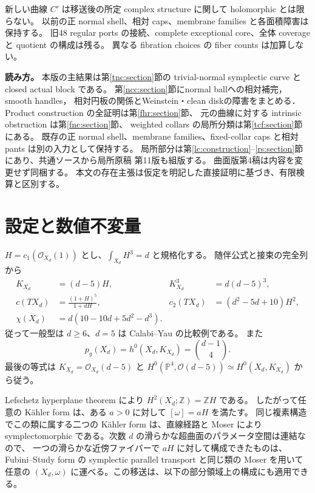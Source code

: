 \documentclass[11pt,a4paper]{article}
\theoremstyle{definition}
\newcommand{\PP}{\mathbb P}
\newcommand{\ZZ}{\mathbb Z}
\begin{document}
新しい曲線 $C'$ は移送後の所定 complex structure に関して holomorphic とは限らない。
以前の正 normal shell、相対 caps、membrane families と各面積障害は保持する。
旧48 regular ports の接続、complete exceptional core、全体 coverage と quotient の構成は残る。
異なる fibration choices の fiber counts は加算しない。

\clearpage
\begingroup
\small
\setlength{\parskip}{0pt}
\makeatletter
\renewcommand*{\@pnumwidth}{2.2em}
\renewcommand*{\@tocrmarg}{3.2em}
\renewcommand*{\l@section}[2]{\@dottedtocline{1}{0em}{3.4em}{\bfseries #1}{\bfseries #2}}
\makeatother
\tableofcontents
\endgroup
\medskip
\noindent\textbf{読み方。}
本版の主結果は第\ref{tnc:section}節の trivial-normal symplectic curve と closed actual block である。
第\ref{ncc:section}節にnormal ballへの相対補完，smooth handles，
相対円板の関係とWeinstein・clean diskの障害をまとめる．
Product construction の全証明は第\ref{fhr:section}節、
元の曲線に対する intrinsic obstruction は第\ref{fnc:section}節、
weighted collars の局所分類は第\ref{tcf:section}節にある。
既存の正 normal shell、membrane families、fixed-collar caps と相対 pants は別の入力として保持する。
局所部分は第\ref{lc:construction}--\ref{rs:section}節にあり、共通ソースから局所原稿 第11版も組版する。
曲面版第4稿は内容を変更せず同梱する。
本文の存在主張は仮定を明記した直接証明に基づき、有限検算と区別する。

\clearpage

\section{設定と数値不変量}\label{sec:invariants}

$H=c_1(\mathcal O_{X_d}(1))$ とし、$\int_{X_d}H^3=d$ と規格化する。
随伴公式と接束の完全列から
\begin{align}
K_{X_d}&=(d-5)H,& K_{X_d}^3&=d(d-5)^3,\label{eq:canonical}\\
c(TX_d)&=\frac{(1+H)^5}{1+dH},&
c_2(TX_d)&=(d^2-5d+10)H^2,\nonumber\\
\chi(X_d)&=d(10-10d+5d^2-d^3).\label{eq:chern-euler}
\end{align}
従って一般型は $d\ge6$、$d=5$ は Calabi--Yau の比較例である。
また
\[
p_g(X_d)=h^0(X_d,K_{X_d})=\binom{d-1}{4}.
\]
最後の等式は $K_{X_d}=\mathcal O_{X_d}(d-5)$ と
$H^0(\PP^4,\mathcal O(d-5))\simeq H^0(X_d,K_{X_d})$ から従う。

Lefschetz hyperplane theorem により $H^2(X_d;\ZZ)=\ZZ H$ である。
したがって任意の Kähler form は、ある $a>0$ に対して $[\omega]=aH$ を満たす。
同じ複素構造でこの類に属する二つの Kähler form は、直線経路と Moser により
symplectomorphic である。次数 $d$ の滑らかな超曲面のパラメータ空間は連結なので、
一つの滑らかな近傍ファイバーで $aH$ に対して構成できたものは、
Fubini--Study form の symplectic parallel transport と同じ類の Moser を用いて
任意の $(X_d,\omega)$ に運べる。この移送は、以下の部分領域上の構成にも適用できる。
\end{document}
